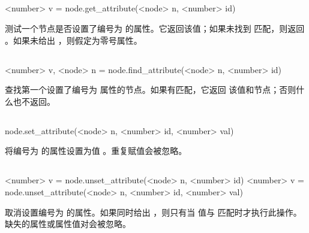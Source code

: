 \subsection{}


\begin{typing}
<number> v =
    node.get_attribute(<node> n, <number> id)
\end{typing}

测试一个节点是否设置了编号为  的属性。它返回该值；如果未找到
匹配，则返回 。如果未给出 ，则假定为零号属性。

\subsection{}


\begin{typing}
<number> v, <node> n =
    node.find_attribute(<node> n, <number> id)
\end{typing}

查找第一个设置了编号为  属性的节点。如果有匹配，它返回
该值和节点；否则什么也不返回。

\subsection{}


\begin{typing}
node.set_attribute(<node> n, <number> id, <number> val)
\end{typing}

将编号为  的属性设置为值 。重复赋值会被忽略。

\subsection{}


\begin{typing}
<number> v =
    node.unset_attribute(<node> n, <number> id)
<number> v =
    node.unset_attribute(<node> n, <number> id, <number> val)
\end{typing}

取消设置编号为  的属性。如果同时给出 ，则只有当
值与  匹配时才执行此操作。缺失的属性或属性值对会被忽略。

